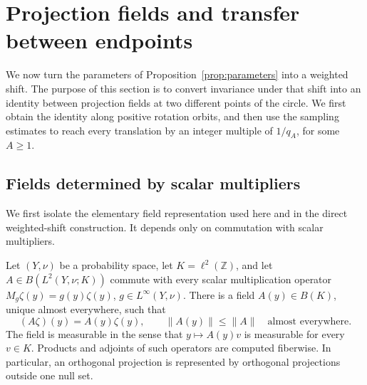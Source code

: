 \section{Projection fields and transfer between endpoints}
\label{sec:fields}

We now turn the parameters of Proposition~\ref{prop:parameters} into a
weighted shift.  The purpose of this section is to convert invariance under
that shift into an identity between projection fields at two different
points of the circle.  We first obtain the identity along positive rotation
orbits, and then use the sampling estimates to reach every translation by
an integer multiple of $1/q_A$, for some $A\ge1$.

\subsection{Fields determined by scalar multipliers}

We first isolate the elementary field representation used here and in the
direct weighted-shift construction.  It depends only on commutation with
scalar multipliers.

\begin{lemma}\label{lem:scalar-multiplier-fields}
Let $(Y,\nu)$ be a probability space, let $K=\ell^2(\mathbb Z)$, and let
$A\in B(L^2(Y,\nu;K))$ commute with every scalar multiplication operator
$M_g\zeta(y)=g(y)\zeta(y)$, $g\in L^\infty(Y,\nu)$.
There is a field $A(y)\in B(K)$, unique
almost everywhere, such that
\[
 (A\zeta)(y)=A(y)\zeta(y),\qquad
 \|A(y)\|\le\|A\|\quad\text{almost everywhere}.
\]
The field is measurable in the sense that $y\mapsto A(y)v$ is measurable
for every $v\in K$.  Products and adjoints of such operators are computed
fiberwise.  In particular, an orthogonal projection is represented by
orthogonal projections outside one null set.
\end{lemma}

